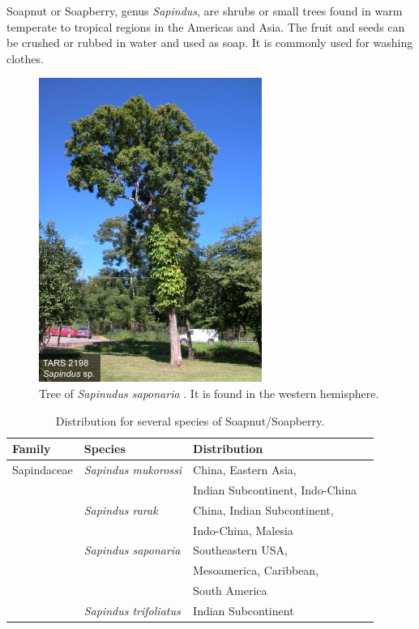 \documentclass[a4paper]{article}
\begin{document}
Soapnut or Soapberry, genus {\it Sapindus}, are shrubs or small trees found in 
warm temperate to tropical regions in the Americas and Asia. 
The fruit and seeds can be crushed or rubbed in water and used as soap.
It is commonly used for washing clothes.

\begin{figure}[H]
\centering
\includegraphics{images/sapindus_saponaria_tree}
\caption{Tree of {\it Sapinudus saponaria} \citep{USDA}. 
         It is found in the western hemisphere.} 
\end{figure}

\begin{table}[H]
\centering
\begin{tabular}{llll} \toprule
Family & Species & Distribution \\ \midrule
Sapindaceae & {\it Sapindus mukorossi} & China, Eastern Asia, \\
            &                          & Indian Subcontinent, Indo-China \\
            & {\it Sapindus rarak}     & China, Indian Subcontinent, \\
            &                          & Indo-China, Malesia \\
            & {\it Sapindus saponaria} & Southeastern USA, \\
            &                          & Mesoamerica, Caribbean, \\
            &                          & South America \\
            & {\it Sapindus trifoliatus} & Indian Subcontinent \\
\bottomrule
\end{tabular}
\caption{Distribution for several species of Soapnut/Soapberry.}
\end{table}
\end{document}
